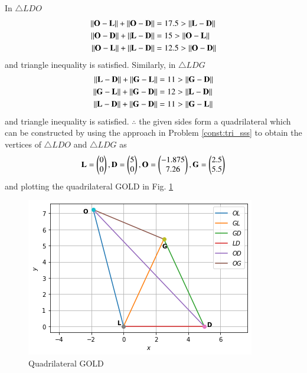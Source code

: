 In  $\triangle LDO$
\begin{align}
\left\lVert\mathbf{O}-\mathbf{L}\right\rVert+\left\lVert\mathbf{O}-\mathbf{D}\right\rVert&=17.5> \left\lVert\mathbf{L}-\mathbf{D}\right\rVert\\
\left\lVert\mathbf{O}-\mathbf{D}\right\rVert+\left\lVert\mathbf{L}-\mathbf{D}\right\rVert&=15>\left\lVert\mathbf{O}-\mathbf{L}\right\rVert\\
\left\lVert\mathbf{O}-\mathbf{L}\right\rVert+\left\lVert\mathbf{L}-\mathbf{D}\right\rVert&=12.5>\left\lVert\mathbf{O}-\mathbf{D}\right\rVert
\end{align}
and triangle inequality is satisfied.
%
Similarly, in $\triangle LDG$
\begin{align}
\left\lVert\mathbf{L}-\mathbf{D}\right\rVert + \left\lVert\mathbf{G}-\mathbf{L}\right\rVert&=11 > \left\lVert\mathbf{G}-\mathbf{D}\right\rVert
\\
\left\lVert\mathbf{G}-\mathbf{L}\right\rVert + \left\lVert\mathbf{G}-\mathbf{D}\right\rVert&=12 > \left\lVert\mathbf{L}-\mathbf{D}\right\rVert
\\
\left\lVert\mathbf{L}-\mathbf{D}\right\rVert + \left\lVert\mathbf{G}-\mathbf{D}\right\rVert&=11 > \left\lVert\mathbf{G}-\mathbf{L}\right\rVert
\end{align}
and triangle inequality is satisfied.  
$\therefore$ the given sides form a quadrilateral which can be constructed by
using the approach in Problem \ref{const:tri_sss} to obtain the vertices of $\triangle LDO$ and 
$\triangle LDG$ as
\begin{align}
\mathbf{L}=\begin{pmatrix}0\\0\end{pmatrix},\mathbf{D} = \begin{pmatrix}5\\0\end{pmatrix}, \mathbf{O}=\begin{pmatrix}-1.875\\7.26\end{pmatrix},\mathbf{G}=\begin{pmatrix}2.5\\5.5\end{pmatrix}
\end{align}
and plotting the quadrilateral GOLD  in Fig. \ref{constr/34/fig:Quadrilateral GOLD}
%
\begin{figure}[!ht]
    \centering
    \includegraphics[width=\columnwidth]{solutions/34/GOLDfig.png}
    \caption{Quadrilateral GOLD}
    \label{constr/34/fig:Quadrilateral GOLD}
\end{figure}



